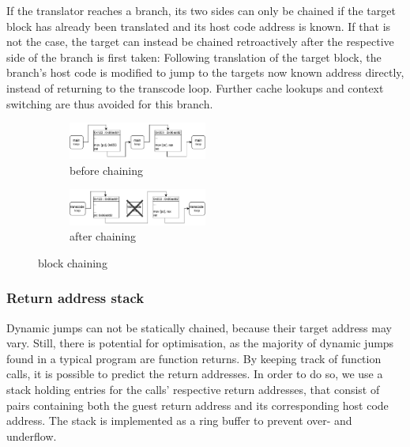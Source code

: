 If the translator reaches a branch, its two sides can only be chained if the target block has already been translated and its host code address is known.
If that is not the case, the target can instead be chained retroactively after the respective side of the branch is first taken: Following translation of the target block, the branch's host code is modified to jump to the targets now known address directly, instead of returning to the transcode loop.
Further cache lookups and context switching are thus avoided for this branch.


\begin{figure}[h]
	\begin{center}
		\begin{subfigure}[b]{\textwidth}
			\centering
			\includegraphics[width=0.5\textwidth]{media/chaining-unchained.pdf}
			\caption{before chaining}
		\end{subfigure}
		\begin{subfigure}[b]{\textwidth}
			\centering
			\includegraphics[width=0.5\textwidth]{media/chaining-chained.pdf}
			\caption{after chaining}
		\end{subfigure}
	\end{center}
	
	\caption{block chaining}
\end{figure}


\subsubsection{Return address stack}
\label{sec:return-address-stack}
Dynamic jumps can not be statically chained, because their target address may vary.
Still, there is potential for optimisation, as the majority of dynamic jumps found in a typical program are function returns.
By keeping track of function calls, it is possible to predict the return addresses.
In order to do so, we use a stack holding entries for the calls' respective return addresses, that consist of pairs containing both the guest return address and its corresponding host code address.
The stack is implemented as a ring buffer to prevent over- and underflow.

